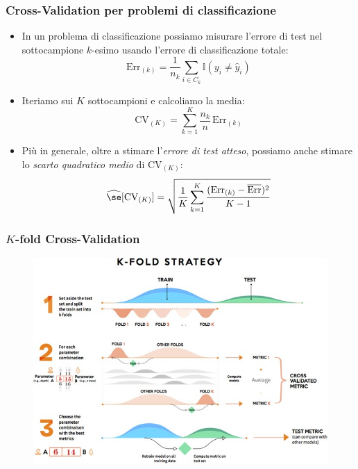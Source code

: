 \begin{frame}
	\frametitle{Cross-Validation per problemi di classificazione}

	\begin{itemize}
		\item In un problema di classificazione possiamo misurare l'errore di test nel sottocampione $k$-esimo usando l'errore di classificazione totale:
		\[
		\mbox{Err}_{(k)} = \frac{1}{n_k}\sum_{i\in C_k} \mathbb{I}(y_i\not= \hat y _i)
		\]

		\item Iteriamo sui $K$ sottocampioni e calcoliamo la media:
		\[
		\mbox{CV}_{(K)} = \sum_{k=1}^K \frac{n_k}{n} \, \mbox{Err}_{(k)}
		\]

		\item Più in generale, oltre a stimare l'\emph{errore di test atteso}, possiamo anche stimare lo \emph{scarto quadratico medio} di $\mbox{CV}_{(K)}$:
		\[
		\widehat{\se}[\mbox{CV}_{(K)}] = \sqrt{\frac{1}{K} \sum_{k=1}^K \frac{(\mbox{Err}_{(k)}-\overline{\mbox{Err}})^2}{K-1}}
		\]

	\end{itemize}
\end{frame}


\begin{frame}

	\frametitle{$K$-fold Cross-Validation}
	\begin{figure}[!htbp]
		\centering
		\includegraphics[width=0.85\linewidth]{images/supervised/validation_test_splitting_data/Kfold.jpg}
	\end{figure}
\end{frame}


